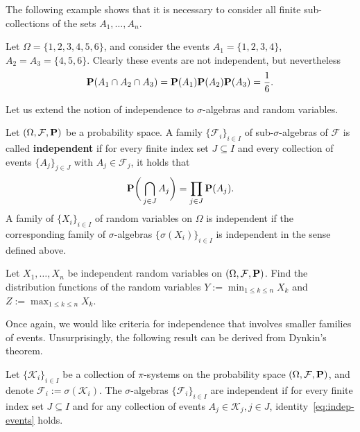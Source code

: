 The following example shows that it is necessary to consider all finite sub-collections of the sets $A_1, \ldots, A_n$.
\begin{example}
Let $\Omega = \{1,2,3,4,5,6\}$, and consider the events $A_1 = \{1,2,3,4\}$, $A_2 = A_3 = \{4,5,6\}$. Clearly these events are not independent, but nevertheless
\begin{equation*}
    \mathbf{P}(A_1 \cap A_2 \cap A_3) = \mathbf{P}(A_1)\mathbf{P}(A_2)\mathbf{P}(A_3) = \frac{1}{6}.
\end{equation*}
\end{example}

Let us extend the notion of independence to $\sigma$-algebras and random variables.

\begin{definition}
    Let $(\Omega,\mathcal{F},\mathbf{P})$ be a probability space. A family $\{\mathcal{F}_i\}_{i\in I}$ of sub-$\sigma$-algebras of $\mathcal{F}$ is called \textbf{independent} if for every finite index set $J\subseteq I$ and every collection of events $\{A_j\}_{j\in J}$ with $A_j\in\mathcal{F}_j$, it holds that
    \begin{equation}
    \label{eq:indep-events}
        \mathbf{P}\bigg(\bigcap_{j\in J}A_j\bigg) = \prod_{j\in J}\mathbf{P}(A_j).
    \end{equation}
    A family of $\{X_i\}_{i\in I}$ of random variables on $\Omega$ is independent if the corresponding family of $\sigma$-algebras $\{\sigma(X_i)\}_{i\in I}$ is independent in the sense defined above.
\end{definition}

\begin{exercise}
    Let $X_1,\ldots, X_n$ be independent random variables on $(\Omega,\mathcal{F},\mathbf{P})$. Find the distribution functions of the random variables $Y:=\min_{1\le k\le n}X_k$ and $Z:=\max_{1\le k\le n}X_k$.
\end{exercise}

Once again, we would like criteria for independence that involves smaller families of events. Unsurprisingly, the following result can be derived from Dynkin's theorem.
\begin{proposition}
\label{prop:indep-pi-system}
    Let $\{\mathcal{K}_i\}_{i\in I}$ be a collection of $\pi$-systems on the probability space $(\Omega,\mathcal{F},\mathbf{P})$, and denote $\mathcal{F}_i:=\sigma(\mathcal{K}_i)$. The $\sigma$-algebras $\{\mathcal{F}_i\}_{i\in I}$ are independent if for every finite index set $J\subseteq I$ and for any collection of events $A_j\in\mathcal{K}_j, j\in J$, identity~\eqref{eq:indep-events} holds.
\end{proposition}

